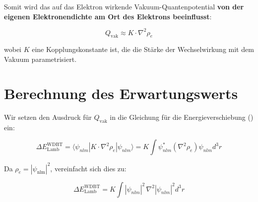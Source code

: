 Somit wird das auf das Elektron wirkende Vakuum-Quantenpotential \textbf{von der eigenen Elektronendichte am Ort des Elektrons beeinflusst}:

\begin{equation}
    Q_{\text{vak}} \approx K \cdot \nabla^2 \rho_e    
\end{equation}

wobei $K$ eine Kopplungskonstante ist, die die Stärke der Wechselwirkung mit dem Vakuum parametrisiert.

\section{Berechnung des Erwartungswerts}
Wir setzen den Ausdruck für $Q_\text{vak}$ in die Gleichung für die Energieverschiebung () ein:

\begin{equation}
    \Delta E_{\text{Lamb}}^{\text{WDBT}} = \langle \psi_{nlm} | K \cdot \nabla^2 \rho_e | \psi_{nlm} \rangle = K \int \psi_{nlm}^* (\nabla^2 \rho_e) \psi_{nlm}  d^3r
\end{equation}

Da $\rho_e = \left| \psi_\text{nlm}\right|^2$, vereinfacht sich dies zu:

\begin{equation}
    \Delta E_{\text{Lamb}}^{\text{WDBT}} = K \int |\psi_{nlm}|^2 \, \nabla^2 |\psi_{nlm}|^2  d^3r
\end{equation}

